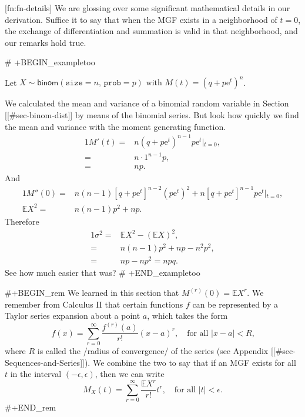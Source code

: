 [fn:fn-details] We are glossing over some significant mathematical
details in our derivation. Suffice it to say that when the MGF exists
in a neighborhood of \(t=0\), the exchange of differentiation and
summation is valid in that neighborhood, and our remarks hold true.

# +BEGIN_exampletoo

Let \(X \sim \mathsf{binom}(\mathtt{size} = n,\,\mathtt{prob} = p)
\mbox{ with $M(t) = (q + p \mathrm{e}^{t})^{n}$}\).

We calculated the mean and variance of a binomial random variable in
Section [[#sec-binom-dist]] by means of the binomial series. But
look how quickly we find the mean and variance with the moment
generating function.
\begin{alignat*}{1}
M'(t)= & n(q+p\mathrm{e}^{t})^{n-1}p\mathrm{e}^{t}\left|_{t=0}\right.,\\
= & n\cdot1^{n-1}p,\\
= & np.
\end{alignat*}
And
\begin{alignat*}{1}
M''(0)= & n(n-1)[q+p\mathrm{e}^{t}]^{n-2}(p\mathrm{e}^{t})^{2}+n[q+p\mathrm{e}^{t}]^{n-1}p\mathrm{e}^{t}\left|_{t=0}\right.,\\
\mathbb{E} X^{2}= & n(n-1)p^{2}+np.
\end{alignat*}
Therefore
\begin{alignat*}{1}
\sigma^{2}= & \mathbb{E} X^{2}-(\mathbb{E} X)^{2},\\
= & n(n-1)p^{2}+np-n^{2}p^{2},\\
= & np-np^{2}=npq.
\end{alignat*}
See how much easier that was?
# +END_exampletoo

#+BEGIN_rem
We learned in this section that \(M^{(r)}(0) = \mathbb{E} X^{r}\). We
remember from Calculus II that certain functions \(f\) can be
represented by a Taylor series expansion about a point \(a\), which
takes the form
\begin{equation}
f(x)=\sum_{r=0}^{\infty}\frac{f^{(r)}(a)}{r!}(x-a)^{r},\quad \mbox{for all \(|x-a| < R\),}
\end{equation}
where \(R\) is called the /radius of convergence/ of the series (see
Appendix [[#sec-Sequences-and-Series]]). We combine the two to say that if an
MGF exists for all \(t\) in the interval \((-\epsilon,\epsilon)\),
then we can write
\begin{equation}
M_{X}(t)=\sum_{r=0}^{\infty}\frac{\mathbb{E} X^{r}}{r!}t^{r},\quad \mbox{for all $|t|<\epsilon$.}
\end{equation}
#+END_rem

